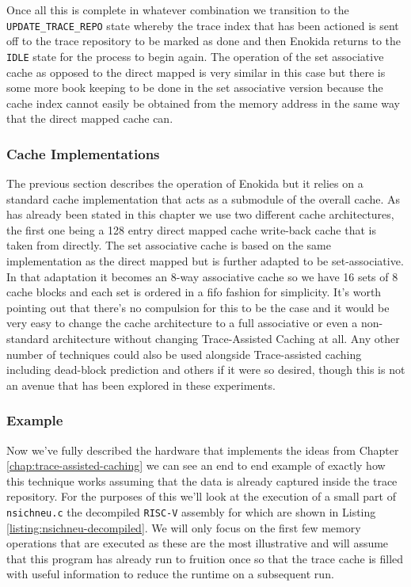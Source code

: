 Once all this is complete in whatever combination we transition to the \texttt{UPDATE\_TRACE\_REPO} state whereby the trace index that has been actioned is sent off to the trace repository to be marked as done and then Enokida returns to the \texttt{IDLE} state for the process to begin again. The operation of the set associative cache as opposed to the direct mapped is very similar in this case but there is some more book keeping to be done in the set associative version because the cache index cannot easily be obtained from the memory address in the same way that the direct mapped cache can.

\subsubsection{Cache Implementations}

The previous section describes the operation of Enokida but it relies on a standard cache implementation that acts as a submodule of the overall cache. As has already been stated in this chapter we use two different cache architectures, the first one being a 128 entry direct mapped cache write-back cache that is taken from \citet{hennessyComputerArchitectureQuantitative2019} directly. The set associative cache is based on the same implementation as the direct mapped but is further adapted to be set-associative. In that adaptation it becomes an 8-way associative cache so we have 16 sets of 8 cache blocks and each set is ordered in a \gls{fifo} fashion for simplicity. It's worth pointing out that there's no compulsion for this to be the case and it would be very easy to change the cache architecture to a full associative or even a non-standard architecture without changing Trace-Assisted Caching at all. Any other number of techniques could also be used alongside Trace-assisted caching including dead-block prediction and others if it were so desired, though this is not an avenue that has been explored in these experiments. 

\subsubsection{Example}

Now we've fully described the hardware that implements the ideas from Chapter \ref{chap:trace-assisted-caching} we can see an end to end example of exactly how this technique works assuming that the data is already captured inside the trace repository. For the purposes of this we'll look at the execution of a small part of \texttt{nsichneu.c} the decompiled \texttt{RISC-V} assembly for which are shown in Listing \ref{listing:nsichneu-decompiled}. We will only focus on the first few memory operations that are executed as these are the most illustrative and will assume that this program has already run to fruition once so that the trace cache is filled with useful information to reduce the runtime on a subsequent run.

